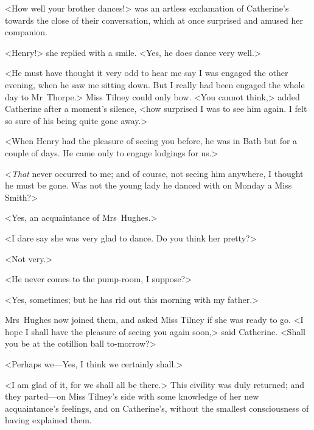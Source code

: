  <How well your brother dances!> was an artless exclamation of Catherine's towards the close of their conversation, which at once surprised and amused her companion. 

 <Henry!> she replied with a smile. <Yes, he does dance very well.> 

 <He must have thought it very odd to hear me say I was engaged the other evening, when he saw me sitting down. But I really had been engaged the whole day to Mr~Thorpe.> Miss Tilney could only bow. <You cannot think,> added Catherine after a moment's silence, <how surprised I was to see him again. I felt so sure of his being quite gone away.> 

 <When Henry had the pleasure of seeing you before, he was in Bath but for a couple of days. He came only to engage lodgings for us.> 

 <\textit{That} never occurred to me; and of course, not seeing him anywhere, I thought he must be gone. Was not the young lady he danced with on Monday a Miss Smith?> 

 <Yes, an acquaintance of Mrs~Hughes.> 

 <I dare say she was very glad to dance. Do you think her pretty?> 

 <Not very.> 

 <He never comes to the pump-room, I suppose?> 

 <Yes, sometimes; but he has rid out this morning with my father.> 

 Mrs~Hughes now joined them, and asked Miss Tilney if she was ready to go. <I hope I shall have the pleasure of seeing you again soon,> said Catherine. <Shall you be at the cotillion ball to-morrow?> 

 <Perhaps we—Yes, I think we certainly shall.> 

 <I am glad of it, for we shall all be there.> This civility was duly returned; and they parted—on Miss Tilney's side with some knowledge of her new acquaintance's feelings, and on Catherine's, without the smallest consciousness of having explained them. 

